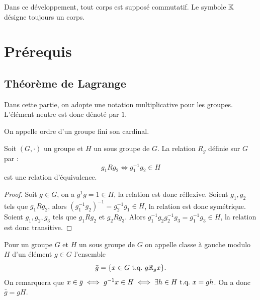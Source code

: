
\renewcommand{\L} {\mathbb{L}}
\renewcommand{\F} {\mathbb{F}}
\newcommand{\U} {\mathcal{U}}
\newcommand{\D} {\mathcal{D}}

\pagestyle{fancy}

\fancyhead[R]{}



Dans ce développement, tout corps est supposé commutatif. Le symbole $\mathbb{K}$ désigne toujours un corps.

\section{Prérequis}

\subsection{Théorème de Lagrange}

Dans cette partie, on adopte une notation multiplicative pour les groupes. L'élément neutre est donc dénoté par $1$.

\begin{defn}
On appelle ordre d'un groupe fini son cardinal.
\end{defn}

\begin{thm}
Soit $(G, \cdot)$ un groupe et $H$ un sous groupe de $G$. La relation $R_g$ définie sur $G$ par :
\[ g_1 R g_2 \iff g_1^{-1}g_2 \in H \]
est une relation d'équivalence.
\end{thm}

\begin{proof}
Soit $g \in G$, on a $g^1 g = 1 \in H$, la relation est donc réflexive. \newline
Soient $g_1, g_2$ tels que $g_1 R g_2$, alors $(g_1^{-1}g_2)^{-1} = g_2^{-1}g_1 \in H$, la relation est donc symétrique. \newline
Soient $g_1, g_2, g_3$ tels que $g_1 R g_2$ et $g_2 R g_3$. Alors $g_1^{-1}g_2 g_2^{-1}g_3 = g_1^{-1}g_3 \in H$,
la relation est donc transitive.
\end{proof}

\begin{defn}
Pour un groupe $G$ et $H$ un sous groupe de $G$ on appelle classe à gauche modulo $H$ d'un élément $g \in G$ l'ensemble 
\[ \bar{g} = \{ x \in G \text{~t.q.~} g \mathbb{R}_g x \} . \]
On remarquera que $x \in \bar{g} \iff g^{-1}x \in H \iff \exists h \in H \text{~t.q.~} x = gh$. On a donc $\bar{g} = gH$.
\end{defn}

